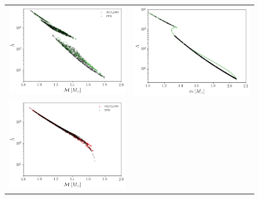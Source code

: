 \documentclass[aps,prl,twocolumn,superscriptaddress,footinbib]{revtex4-1}
\begin{document}
\begin{figure}
    \begin{tabular}{cc}
      \includegraphics[width=0.9\columnwidth]{SKI52009_ppd.png} &
      \includegraphics[width=0.9\columnwidth]{SKI52009_ppd2.png} \\
      \includegraphics[width=0.9\columnwidth]{SK2723505_ppd.png} &

\end{tabular}
\end{figure}
\end{document}

